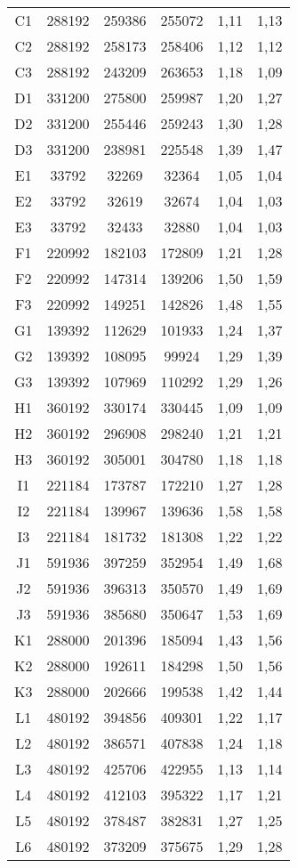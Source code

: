 \begin{center}
\begin{longtable}{cccccc}
    C1    & 288192 & 259386 & 255072 & 1,11  & 1,13 \\
    C2    & 288192 & 258173 & 258406 & 1,12  & 1,12 \\
    C3    & 288192 & 243209 & 263653 & 1,18  & 1,09 \\
    D1    & 331200 & 275800 & 259987 & 1,20  & 1,27 \\
    D2    & 331200 & 255446 & 259243 & 1,30  & 1,28 \\
    D3    & 331200 & 238981 & 225548 & 1,39  & 1,47 \\
    E1    & 33792 & 32269 & 32364 & 1,05  & 1,04 \\
    E2    & 33792 & 32619 & 32674 & 1,04  & 1,03 \\
    E3    & 33792 & 32433 & 32880 & 1,04  & 1,03 \\
    F1    & 220992 & 182103 & 172809 & 1,21  & 1,28 \\
    F2    & 220992 & 147314 & 139206 & 1,50  & 1,59 \\
    F3    & 220992 & 149251 & 142826 & 1,48  & 1,55 \\
    G1    & 139392 & 112629 & 101933 & 1,24  & 1,37 \\
    G2    & 139392 & 108095 & 99924 & 1,29  & 1,39 \\
    G3    & 139392 & 107969 & 110292 & 1,29  & 1,26 \\
    H1    & 360192 & 330174 & 330445 & 1,09  & 1,09 \\
    H2    & 360192 & 296908 & 298240 & 1,21  & 1,21 \\
    H3    & 360192 & 305001 & 304780 & 1,18  & 1,18 \\
    I1    & 221184 & 173787 & 172210 & 1,27  & 1,28 \\
    I2    & 221184 & 139967 & 139636 & 1,58  & 1,58 \\
    I3    & 221184 & 181732 & 181308 & 1,22  & 1,22 \\
    J1    & 591936 & 397259 & 352954 & 1,49  & 1,68 \\
    J2    & 591936 & 396313 & 350570 & 1,49  & 1,69 \\
    J3    & 591936 & 385680 & 350647 & 1,53  & 1,69 \\
    K1    & 288000 & 201396 & 185094 & 1,43  & 1,56 \\
    K2    & 288000 & 192611 & 184298 & 1,50  & 1,56 \\
    K3    & 288000 & 202666 & 199538 & 1,42  & 1,44 \\
    L1    & 480192 & 394856 & 409301 & 1,22  & 1,17 \\
    L2    & 480192 & 386571 & 407838 & 1,24  & 1,18 \\
    L3    & 480192 & 425706 & 422955 & 1,13  & 1,14 \\
    L4    & 480192 & 412103 & 395322 & 1,17  & 1,21 \\
    L5    & 480192 & 378487 & 382831 & 1,27  & 1,25 \\
    L6    & 480192 & 373209 & 375675 & 1,29  & 1,28 \\
\end{longtable}
\end{center}

